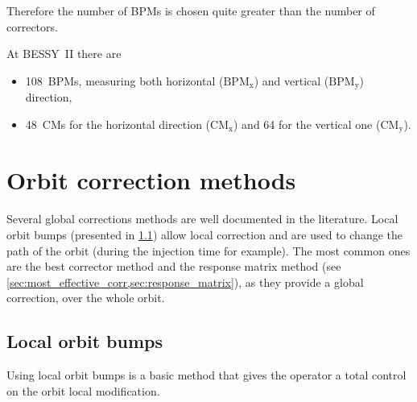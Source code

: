 Therefore the number of BPMs is chosen quite greater than the number of correctors.

At BESSY~II there are
\begin{itemize}
	\item 108~BPMs, measuring both horizontal ($\text{BPM}_\text{x}$) and vertical ($\text{BPM}_\text{y}$) direction,
	\item 48~CMs for the horizontal direction ($\text{CM}_\text{x}$) and 64 for the vertical one ($\text{CM}_\text{y}$).
\end{itemize}

\section{Orbit correction methods}
Several global corrections methods are well documented in the literature. Local orbit bumps (presented in \cref{sec:orbit_bump}) allow local correction and are used to change the path of the orbit (during the injection time for example). The most common ones are the best corrector method and the response matrix method (see \cref{sec:most_effective_corr,sec:response_matrix}), as they provide a global correction, over the whole orbit.

\subsection{Local orbit bumps}
\label{sec:orbit_bump}
Using local orbit bumps is a basic method that gives the operator a total control on the orbit local modification.

